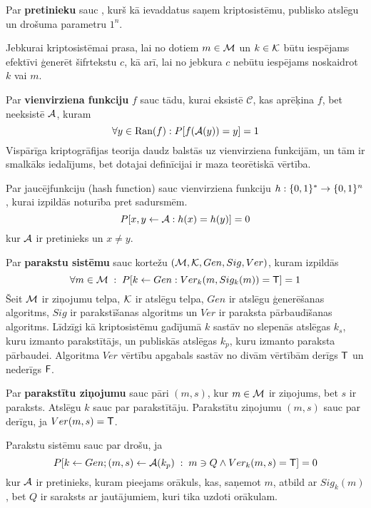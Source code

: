 Par \textbf{pretinieku} sauc \ppt{}, kurš kā ievaddatus saņem kriptosistēmu, publisko atslēgu un drošuma parametru $1^n$.

Jebkurai kriptosistēmai prasa, lai no dotiem $m\in\mathcal{M}$ un $k\in\mathcal{K}$ būtu iespējams efektīvi ģenerēt šifrtekstu $c$, kā arī, lai no jebkura $c$ nebūtu iespējams noskaidrot $k$ vai $m$.

Par \textbf{vienvirziena funkciju} $f$ sauc tādu, kurai eksistē \ppt{} $\mathcal{C}$, kas aprēķina $f$, bet neeksistē \ppt{} $\mathcal{A}$, kuram 
$$ \forall y \in \text{Ran}(f): P[f(\mathcal{A}(y)) = y] = 1 $$
Vispārīga kriptogrāfijas teorija daudz balstās uz vienvirziena funkcijām, un tām ir smalkāks iedalījums, bet dotajai definīcijai ir maza teorētiskā vērtība.

Par jaucējfunkciju (hash function) sauc vienvirziena funkciju $h: \{0,1\}^* \to \{0,1\}^n$, kurai izpildās noturība pret sadursmēm. 
\begin{equation*}
    P[x, y \leftarrow \mathcal{A} : h(x) = h(y)] = 0
\end{equation*}
kur $\mathcal{A}$ ir pretinieks un $x\neq y$.

Par \textbf{parakstu sistēmu} sauc kortežu $(\mathcal{M}, \mathcal{K}, Gen, Sig, Ver)$, kuram izpildās
\begin{equation*}
    \forall m \in \mathcal{M} \;:\; P[k \leftarrow Gen: Ver_k(m, Sig_k(m))=\textsf{T}] = 1
\end{equation*}
Šeit $\mathcal{M}$ ir ziņojumu telpa, $\mathcal{K}$ ir atslēgu telpa, $Gen$ ir atslēgu ģenerēšanas algoritms, $Sig$ ir parakstīšanas algoritms un $Ver$ ir paraksta pārbaudīšanas algoritms. Līdzīgi kā kriptosistēmu gadījumā $k$ sastāv no slepenās atslēgas $k_s$, kuru izmanto parakstītājs, un publiskās atslēgas $k_p$, kuru izmanto paraksta pārbaudei. Algoritma $Ver$ vērtību apgabals sastāv no divām vērtībām \textemdash{} derīgs $\textsf{T}$ un nederīgs $\textsf{F}$.

Par \textbf{parakstītu ziņojumu} sauc pāri $(m, s)$, kur $m\in \mathcal{M}$ ir ziņojums, bet $s$ ir paraksts. Atslēgu $k$ sauc par parakstītāju. Parakstītu ziņojumu $(m,s)$ sauc par derīgu, ja $Ver(m,s) =\textsf{T}$.

Parakstu sistēmu sauc par drošu, ja
\begin{equation*}
    P[k \leftarrow Gen; (m,s) \leftarrow \mathcal{A} (k_p)\;:\; m\ni Q \wedge Ver_k(m,s) =\textsf{T}] = 0
\end{equation*}
kur $\mathcal{A}$ ir pretinieks, kuram pieejams orākuls, kas, saņemot $m$, atbild ar $Sig_k(m)$, bet $Q$ ir saraksts ar jautājumiem, kuri tika uzdoti orākulam.\cite[p.~135]{pass10}

